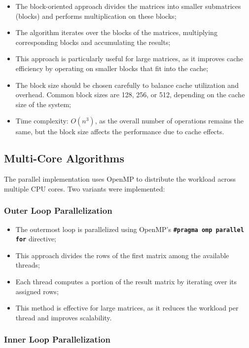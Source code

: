 \documentclass{article}
\begin{document}
\begin{itemize}
\item The block-oriented approach divides the matrices into smaller submatrices (blocks) and performs multiplication on these blocks;
\item The algorithm iterates over the blocks of the matrices, multiplying corresponding blocks and accumulating the results;
\item This approach is particularly useful for large matrices, as it improves cache efficiency by operating on smaller blocks that fit into the cache;
\item The block size should be chosen carefully to balance cache utilization and overhead. Common block sizes are 128, 256, or 512, depending on the cache size of the system;
\item Time complexity: $O(n^3)$, as the overall number of operations remains the same, but the block size affects the performance due to cache effects.
\end{itemize}

\subsection{Multi-Core Algorithms}

The parallel implementation uses OpenMP to distribute the workload across multiple CPU cores. Two variants were implemented:

\subsubsection{Outer Loop Parallelization}

\begin{itemize}
\item The outermost loop is parallelized using OpenMP's \textbf{\lstinline{#pragma omp parallel for}} directive;
\item This approach divides the rows of the first matrix among the available threads;
\item Each thread computes a portion of the result matrix by iterating over its assigned rows;
\item This method is effective for large matrices, as it reduces the workload per thread and improves scalability.
\end{itemize}

\subsubsection{Inner Loop Parallelization}
        
\end{document}
